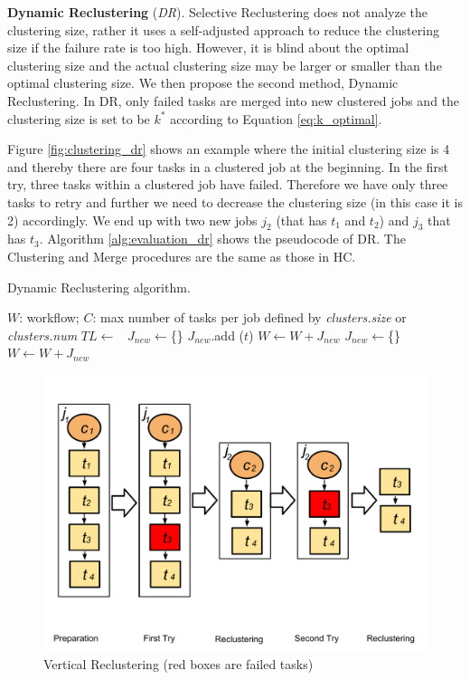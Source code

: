\documentclass{IOS-Book-Article}
\begin{document}
\textbf{Dynamic Reclustering} (\emph{DR}). 
Selective Reclustering does not analyze the clustering size, rather it uses a self-adjusted approach to reduce the clustering size if the failure rate is too high. However, it is blind about the optimal clustering size and the actual clustering size may be larger or smaller than the optimal clustering size. We then propose the second method, Dynamic Reclustering. In DR, only failed tasks are merged into new clustered jobs and the clustering size is set to be $k^*$ according to Equation \ref{eq:k_optimal}.



Figure \ref{fig:clustering_dr} shows an example where the initial clustering size is 4 and thereby there are four tasks in a clustered job at the beginning. In the first try, three tasks within a clustered job have failed. Therefore we have only three tasks to retry and further we need to decrease the clustering size (in this case it is 2) accordingly. We end up with two new jobs $j_2$ (that has $t_1$ and $t_2$) and $j_3$ that has $t_3$. Algorithm \ref{alg:evaluation_dr} shows the pseudocode of DR. The Clustering and Merge procedures are the same as those in HC. 

\begin{algorithm}[!htb]
	\footnotesize
	\caption{Dynamic Reclustering algorithm.}
	\label{alg:evaluation_dr}
	\begin{algorithmic}[1]
		\Require $W$: workflow; $C$: max number of tasks per job defined by \emph{clusters.size} or \emph{clusters.num}
			\State $TL \gets$\ 
			\State $J_{new}\gets$\{\}
					\State $J_{new}$.add ($t$)
				\EndIf
					\State $W \gets W + J_{new}$
					\State $J_{new}\gets$\{\}
				\EndIf
			\EndFor
			\State $W \gets W + J_{new}$ 
		\EndProcedure
	\end{algorithmic}
\end{algorithm}

\begin{figure}[!htb]
\centering
  \includegraphics[width=0.75\linewidth]{vr.pdf}
  \caption{Vertical Reclustering (red boxes are failed tasks)}
  \label{fig:clustering_vr}
\end{figure}
\end{document}
